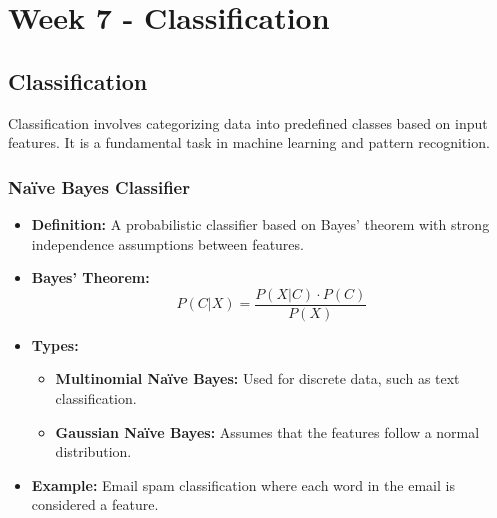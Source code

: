 \documentclass[8pt]{article}
\begin{document}
\newpage
\section{Week 7 - Classification}
\subsection*{Classification}
Classification involves categorizing data into predefined classes based on input features. It is a fundamental task in machine learning and pattern recognition.

\subsubsection{Naïve Bayes Classifier}
\begin{itemize}
    \item \textbf{Definition:} A probabilistic classifier based on Bayes' theorem with strong independence assumptions between features.
    \item \textbf{Bayes' Theorem:}
    \[
    P(C|X) = \frac{P(X|C) \cdot P(C)}{P(X)}
    \]
    \item \textbf{Types:}
    \begin{itemize}
        \item \textbf{Multinomial Naïve Bayes:} Used for discrete data, such as text classification.
        \item \textbf{Gaussian Naïve Bayes:} Assumes that the features follow a normal distribution.
    \end{itemize}
    \item \textbf{Example:} Email spam classification where each word in the email is considered a feature.
\end{itemize}
\end{document}
